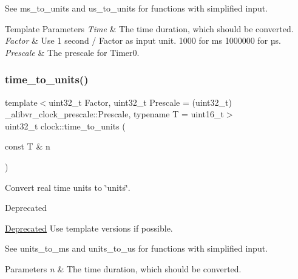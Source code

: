 See ms\+\_\+to\+\_\+units and us\+\_\+to\+\_\+units for functions with simplified input.


\begin{DoxyTemplParams}{Template Parameters}
{\em Time} & The time duration, which should be converted. \\
\hline
{\em Factor} & Use 1 second / Factor as input unit. 1\textquotesingle{}000 for ms 1\textquotesingle{}000\textquotesingle{}000 for µs. \\
\hline
{\em Prescale} & The prescale for {\ttfamily Timer0}. \\
\hline
\end{DoxyTemplParams}
\hypertarget{namespaceclock_a46fd6e3a91d0b307eeea0500d03d12fb}{}\label{namespaceclock_a46fd6e3a91d0b307eeea0500d03d12fb} 
\subsubsection{\texorpdfstring{time\+\_\+to\+\_\+units()}{time\_to\_units()}\hspace{0.1cm}{\footnotesize\ttfamily [2/2]}}
{\footnotesize\ttfamily template$<$uint32\+\_\+t Factor, uint32\+\_\+t Prescale = (uint32\+\_\+t) \+\_\+alibvr\+\_\+clock\+\_\+prescale\+::\+Prescale, typename T  = uint16\+\_\+t$>$ \\
uint32\+\_\+t clock\+::time\+\_\+to\+\_\+units (\begin{DoxyParamCaption}\item[{const T \&}]{n }\end{DoxyParamCaption})\hspace{0.3cm}{\ttfamily [inline]}}



Convert real time units to \char`\"{}units\char`\"{}. 

\begin{DoxyRefDesc}{Deprecated}
\item[\hyperlink{deprecated__deprecated000002}{Deprecated}]Use template versions if possible.\end{DoxyRefDesc}


See units\+\_\+to\+\_\+ms and units\+\_\+to\+\_\+us for functions with simplified input.


\begin{DoxyParams}{Parameters}
{\em n} & The time duration, which should be converted. \\
\hline
\end{DoxyParams}

